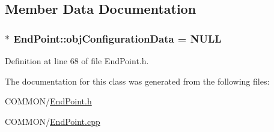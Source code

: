 \subsection{Member Data Documentation}
\subsubsection[{\texorpdfstring{obj\+Configuration\+Data}{objConfigurationData}}]{ $\ast$ End\+Point\+::obj\+Configuration\+Data = N\+U\+LL\hspace{0.3cm}{\ttfamily [static]}}\hypertarget{classipc_1_1EndPoint_a7a04190956500a628f63f5d692ca6857}{}\label{classipc_1_1EndPoint_a7a04190956500a628f63f5d692ca6857}


Definition at line 68 of file End\+Point.\+h.



The documentation for this class was generated from the following files\+:\begin{DoxyCompactItemize}
\item 
C\+O\+M\+M\+O\+N/\hyperlink{EndPoint_8h}{End\+Point.\+h}\item 
C\+O\+M\+M\+O\+N/\hyperlink{EndPoint_8cpp}{End\+Point.\+cpp}\end{DoxyCompactItemize}
